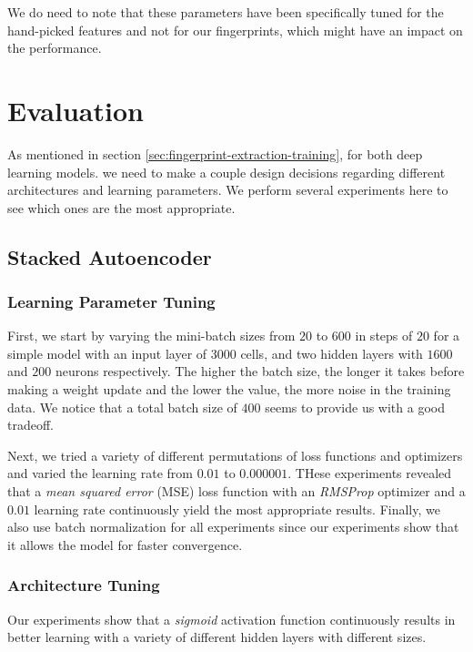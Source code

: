 We do need to note that these parameters have been specifically tuned for the hand-picked features and not for our fingerprints, which might have an impact on the performance.

\section{Evaluation}
As mentioned in section \ref{sec:fingerprint-extraction-training}, for both deep learning models. we need to make a couple design decisions regarding different architectures and learning parameters.
We perform several experiments here to see which ones are the most appropriate.

\subsection{Stacked Autoencoder}

\subsubsection{Learning Parameter Tuning}

First, we start by varying the mini-batch sizes from $20$ to $600$ in steps of $20$ for a simple model with an input layer of $3000$ cells, and two hidden layers with $1600$ and $200$ neurons respectively.
The higher the batch size, the longer it takes before making a weight update and the lower the value, the more noise in the training data.
We notice that a total batch size of $400$ seems to provide us with a good tradeoff.

Next, we tried a variety of different permutations of loss functions and optimizers and varied the learning rate from $0.01$ to $0.000001$.
THese experiments revealed that a \textit{mean squared error} (MSE) loss function with an \textit{RMSProp} optimizer and a $0.01$ learning rate continuously yield the most appropriate results.
Finally, we also use batch normalization for all experiments since our experiments show that it allows the model for faster convergence.

\subsubsection{Architecture Tuning}

Our experiments show that a \textit{sigmoid} activation function continuously results in better learning with a variety of different hidden layers with different sizes.

